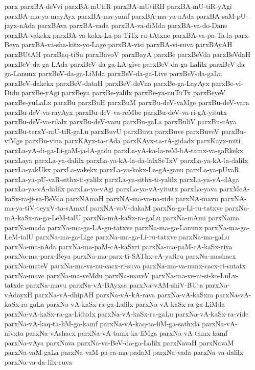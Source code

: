 {parx
parxBA-deVvi
parxBA-mUtiR
parxBA-mUtiRH
parxBA-mU-tiR-yAgi
parxBA-ma-ya-mayAyx
parxBA-ma-yamf
parxBA-ma-ya-nAda
parxBA-saM-pU-jayx-nAda
parxBAva
parxBA-vada
parxBA-va-diMda
parxBA-va-do-Dane
parxBA-vakekx
parxBA-va-kokx-La-pa-TiTx-ru-tAtxne
parxBA-va-pa-Ta-la-parx-Beya
parxBA-va-sha-kitx-yo-Lage
parxBA-visi
parxBA-vi-suva
parxBAyAH
parxBUtAH
parxBaq-tiSu
parxBavoV
parxBayA
parxBe
parxBeVda
parxBeVdaH
parxBeV-da-ga-LAda
parxBeV-da-ga-LA-give
parxBeV-da-ga-Lalilx
parxBeV-da-ga-Lanunx
parxBeV-da-ga-LiMda
parxBeV-da-ga-Live
parxBeV-da-gaLu
parxBeV-dakekx
parxBeV-dataH
parxBeV-deVna
parxBe-ga-LayAyx
parxBe-vi-Didu
parxBe-yAgi
parxBeya
parxBe-yalilx
parxBe-ya-nuTuTx
parxBeyeV
parxBe-yuLaLx
parxBu
parxBuH
parxBuM
parxBu-deV-vaMge
parxBu-deV-vara
parxBu-deV-va-rayAyx
parxBu-deV-va-reMbe
parxBu-deV-va-ri-gA-yitutx
parxBu-deV-va-rilalx
parxBu-deV-varu
parxBu-gaLa
parxBuliV
parxBu-rAya
parxBu-terxY-mU-tiR-gaLu
parxBuvU
parxBuva
parxBuve
parxBuveV
parxBu-viMge
parxBu-vina
parxKAyx-ta-rAda
parxKAyx-ta-rA-gidadx
parxKayx-miti
parxLa-yA-di-ga-Li-gaM-ja-lA-gadu
parxLa-yA-ka-la-reM-bA-tamx-va-gaRkekx
parxLaya
parxLa-ya-dalilx
parxLa-ya-kA-la-da-lalxSeTxV
parxLa-ya-kA-la-dalilx
parxLa-yakUkx
parxLa-yakekx
parxLa-ya-kokx-La-gA-ganu
parxLa-ya-pUvaR
parxLa-ya-pU-vaR-sithx-ti-yalilx
parxLa-ya-sithx-ti-yalilx
parxLa-ya-vA-dAga
parxLa-ya-vA-dalilx
parxLa-ya-vAgi
parxLa-ya-vA-yitutx
parxLa-yava
parxMcA-kaSx-ra-ji-sa-BeVda
parxNAmaH
parxNA-ma-va-na-ride
parxNA-mavu
parxNA-ma-ya-tiV-teyxV-ta-sAmxtf
parxNA-voV-dakaM
parxNa-ga-Li-ru-tatxve
parxNa-mA-kaSx-ra-ga-LeM-talU
parxNa-mA-kaSx-ra-gaLu
parxNa-mAmi
parxNama
parxNa-mada
parxNa-ma-ga-LA-gu-tatxve
parxNa-ma-ga-Lanunx
parxNa-ma-ga-LeM-talU
parxNa-ma-ga-Lige
parxNa-ma-ga-Li-ru-tatxve
parxNa-ma-gaLu
parxNa-ma-nAda
parxNa-ma-paM-cA-kaSxri
parxNa-ma-paM-cA-kaSx-riya
parxNa-ma-parx-Beya
parxNa-ma-parx-ti-SAThx-cA-yaRru
parxNa-mashacx
parxNa-mateV
parxNa-ma-va-nu-cacx-ri-suva
parxNa-ma-va-nunx-cacx-ri-sutatx
parxNa-mave
parxNa-ma-veMdu
parxNa-maveV
parxNa-ma-ve-ni-si-ko-LuLx-tatxde
parxNa-mavu
parxNa-vA-BAyxsa
parxNa-vAM-shiV-BUta
parxNa-vAdayxH
parxNa-vA-dhipAH
parxNa-vA-kA-rava
parxNa-vA-kaSxra
parxNa-vA-kaSx-ra-gaLa
parxNa-vA-kaSx-ra-ga-Lalilx
parxNa-vA-kaSx-ra-ga-LiMda
parxNa-vA-kaSx-ra-ga-Lidudx
parxNa-vA-kaSx-ra-gaLu
parxNa-vA-kaSx-ra-vide
parxNa-vA-kaq-ta-liM-ga-kamf
parxNa-vA-kaq-ta-liM-ga-sathxla
parxNa-vA-nivxta
parxNa-vAshacx
parxNa-vA-tamx-ka-liMga
parxNa-vA-tamx-kamf
parxNa-vAya
parxNava
parxNa-va-BeV-da-ga-Lalilx
parxNavaH
parxNavaM
parxNa-vaM-gaLa
parxNa-vaM-pa-ra-ma-padaM
parxNa-vada
parxNa-va-dalilx
parxNa-va-da-lilx-ruva
}
